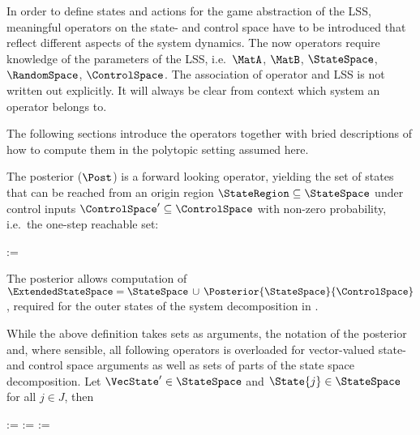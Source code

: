 In order to define states and actions for the game abstraction of the LSS, meaningful operators on the state- and control space have to be introduced that reflect different aspects of the system dynamics.
The now operators require knowledge of the parameters of the LSS, i.e.\ $\MatA$, $\MatB$, $\StateSpace$, $\RandomSpace$, $\ControlSpace$.
The association of operator and LSS is not written out explicitly.
It will always be clear from context which system an operator belongs to.

The following sections introduce the operators together with bried descriptions of how to compute them in the polytopic setting assumed here.



\startsubsection[title={Posterior}]

    The posterior ($\Post$) is a forward looking operator, yielding the set of states that can be reached from an origin region $\StateRegion \subseteq \StateSpace$ under control inputs $\ControlSpace' \subseteq \ControlSpace$ with non-zero probability, i.e.\ the one-step reachable set:

    \startformula
        \Posterior{\StateRegion}{\ControlRegion} :=  \EndPeriod
    \stopformula

    The posterior allows computation of $\ExtendedStateSpace = \StateSpace \,\cup\, \Posterior{\StateSpace}{\ControlSpace}$, required for the outer states of the system decomposition in .

    While the above definition takes sets as arguments, the notation of the posterior and, where sensible, all following operators is overloaded for vector-valued state- and control space arguments as well as sets of parts of the state space decomposition.
    Let $\VecState' \in \StateSpace$ and $\State{j} \in \StateSpace$ for all $j \in J$, then

    \startformula
        \startalign[n=2,align={right,left}]
            \NC {} :=
            \NC {} \EndComma
            \NR
            \NC {} :=
            \NC {} \EndAnd
            \NR
            \NC {} :=
            \NC {} \EndPeriod
            \NR
        \stopalign
    \stopformula

